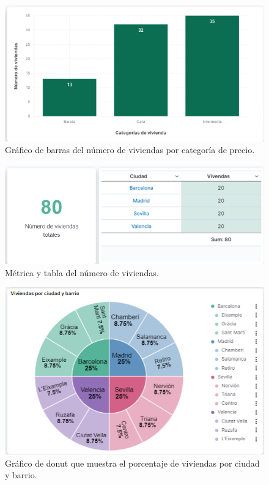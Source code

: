 \begin{figure}
    \centering
    \includegraphics[width=1\linewidth]{img/barrasViv.png}
    \caption{Gráfico de barras del número de viviendas por categoría de precio.}
    \label{fig:barrasViv1}
\end{figure}

\begin{figure}
    \centering
    \includegraphics[width=1\linewidth]{img/metricaViv.png}
    \caption{Métrica y tabla del número de viviendas.}
    \label{fig:metrica2}
\end{figure}

\begin{figure}
    \centering
    \includegraphics[width=1\linewidth]{img/donutViv.png}
    \caption{Gráfico de donut que muestra el porcentaje de viviendas por ciudad y barrio.}
    \label{fig:donut2}
\end{figure}

